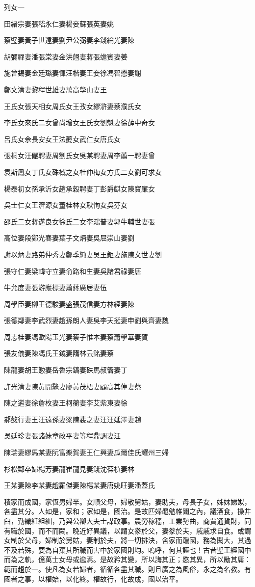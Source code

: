 
\begin{pinyinscope}
列女一

田緒宗妻張嵇永仁妻楊妾蘇張英妻姚

蔡璧妻黃子世遠妻劉尹公弼妻李錢綸光妻陳

胡彌禪妻潘張棠妻金洪翹妻蔣張蟾賓妻姜

施曾錫妻金廷璐妻惲汪楷妻王妾徐馮智懋妻謝

鄭文清妻黎程世雄妻萬高學山妻王

王氏女張天相女周氏女王孜女繆滸妻蔡濮氏女

李氏女來氏二女曾尚增女王氏女劉魁妻徐薛中奇女

呂氏女佘長安女王法夔女武仁女唐氏女

張桐女汪儼聘妻周劉氏女吳某聘妻周李薦一聘妻曾

袁斯鳳女丁氏女硃棫之女杜仲梅女方氏二女劉可求女

楊泰初女孫承沂女趙承穀聘妻丁彭爵麒女陳寶廉女

吳士仁女王濟源女董桂林女耿恂女吳芬女

邵氏二女蔣遂良女徐氏二女李鴻普妻郭牛輔世妻張

高位妻段鄭光春妻葉子文炳妻吳屈崇山妻劉

謝以炳妻路弟仲秀妻鄭季純妻吳王鉅妻施陳文世妻劉

張守仁妻梁韓守立妻俞路和生妻吳諸君祿妻唐

牛允度妻張游應標妻蕭蔣廣居妻伍

周學臣妻柳王德駿妻盛張茂信妻方林經妻陳

張德鄰妻李武烈妻趙孫朗人妻吳李天挺妻申劉與齊妻魏

周志桂妻馮歐陽玉光妻蔡子惟本妻蔡蕭學華妻賀

張友儀妻陳馮氏王鉞妻隋林云銘妻蔡

陳龍妻胡王懃妻岳魯宗鎬妻硃馬叔籥妻丁

許光清妻陳黃開鼇妻廖黃茂梧妻顧高其倬妻蔡

陳之遴妻徐詹枚妻王柯蘅妻李艾紫東妻徐

郝懿行妻王汪遠孫妻梁陳裴之妻汪汪延澤妻趙

吳廷珍妻張諸妹章政平妻等程鼎調妻汪

陳瑞妻繆馬某妻阮富樂賀妻王仁興妻瓜爾佳氏耀州三婦

杉松郵卒婦楊芳妻龍崔龍見妻錢沈葆楨妻林

王某妻陳李某妻趙羅傑妻陳楊某妻唐姚旺妻潘蓋氏

積家而成國，家恆男婦半。女順父母，婦敬舅姑，妻助夫，母長子女，姊妹娣姒，各盡其分。人如是，家和；家如是，國治。是故匹婦黽勉帷闥之內，議酒食，操井臼，勤織紝組紃，乃與公卿大夫士謀政事。農勞稼穡，工業勢曲，商賈通貨財，同有職於國，而不而闕。晚近好異議，以謂女豢於父，妻豢於夫，戚戚求自食。或謂女制於父母，婦制於舅姑，妻制於夫，將一切排決，舍家而躐國，務為閎大，其過不及若殊，要為自棄其所職而害中於家國則均。嗚呼，何其誣也！古昔聖王經國中而為之軌，億萬士女毋或逾焉。是故矜其變，所以誨其正；愍其異，所以勵其庸：範而趨於一。使凡為女若婦者，循循各盡其職。則且廣之為風俗，永之為名教。有國者之事，以權始，以化終。權故行，化故成，國以治平。


\end{pinyinscope}
